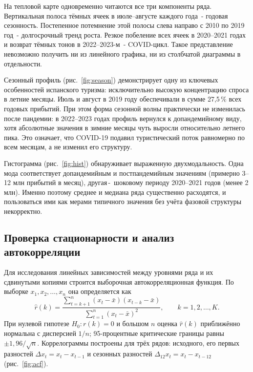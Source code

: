 \documentclass[a4paper,14pt]{extarticle}
\newcommand{\dash}{\,-~}
\begin{document}
На тепловой карте одновременно читаются все три компоненты ряда.
Вертикальная полоса тёмных ячеек в июле–августе каждого года~-
годовая сезонность. Постепенное потемнение этой полосы слева направо
с 2010 по 2019 год~- долгосрочный тренд роста. Резкое побеление
всех ячеек в 2020–2021 годах и возврат тёмных тонов в 2022–2023-м~-
COVID-цикл. Такое представление невозможно получить ни из линейного
графика, ни из столбчатой диаграммы в отдельности.

Сезонный профиль (рис.~\ref{fig:season}) демонстрирует
одну из ключевых особенностей испанского туризма:
исключительно высокую концентрацию спроса в летние месяцы.
Июль и август в 2019 году обеспечивали в сумме 27,5\,\%
всех годовых прибытий. При этом форма сезонной волны
практически не изменилась после пандемии: в 2022–2023 годах
профиль вернулся к допандемийному виду, хотя абсолютные
значения в зимние месяцы чуть выросли относительно летнего пика.
Это означает, что COVID-19 подавил туристический поток
равномерно по всем месяцам, а не изменил его структуру.

Гистограмма (рис.~\ref{fig:hist}) обнаруживает выраженную
двухмодальность. Одна мода соответствует допандемийным
и постпандемийным значениям (примерно 3–12 млн прибытий
в месяц), другая\dash шоковому периоду 2020–2021 годов
(менее 2 млн). Именно поэтому среднее и медиана ряда
существенно расходятся, и пользоваться ими как мерами
типичного значения без учёта фазовой структуры некорректно.

\subsection{Проверка стационарности и анализ автокорреляции}
Для исследования линейных зависимостей между уровнями ряда
и их сдвинутыми копиями строится выборочная автокорреляционная
функция. По выборке $x_1, x_2, \ldots, x_n$ она определяется как
\begin{equation}
\hat{r}(k) =
\dfrac{\displaystyle\sum_{t=k+1}^{n}\left(x_{t}-\bar{x}\right)\left(x_{t-k}-\bar{x}\right)}
{\displaystyle\sum_{t=1}^{n}\left(x_{t}-\bar{x}\right)^{2}},
\qquad k=1,2,\ldots,K.
\label{eq:acf}
\end{equation}
При нулевой гипотезе $H_0: r(k)=0$ и большом $n$ оценка
$\hat{r}(k)$ приближённо нормальна с дисперсией $1/n$;
95-процентные критические границы равны $\pm 1{,}96/\sqrt{n}$.
Коррелограммы построены для трёх рядов: исходного, его первых
разностей $\Delta x_t = x_t - x_{t-1}$ и сезонных разностей
$\Delta_{12} x_t = x_t - x_{t-12}$ (рис.~\ref{fig:acf}).
\end{document}

